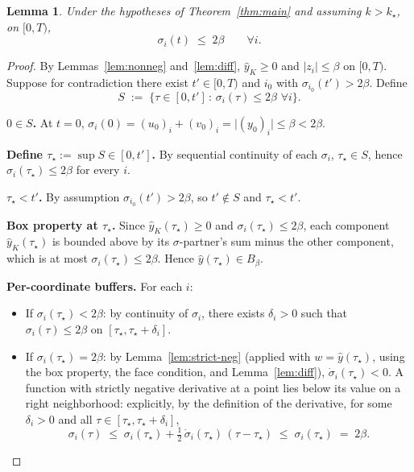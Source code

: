 \documentclass[11pt]{article}
\newtheorem{lemma}[theorem]{Lemma}
\newcommand{\abs}[1]{\lvert #1 \rvert}
\begin{document}
\begin{lemma}\label{lem:sigma}
Under the hypotheses of Theorem~\ref{thm:main} and assuming
$k > k_\star$, on $[0, T)$,
\[
  \sigma_i(t) \;\le\; 2\beta \qquad \forall i.
\]
\end{lemma}

\begin{proof}
By Lemmas~\ref{lem:nonneg} and~\ref{lem:diff}, $\widehat y_K \ge 0$ and
$\abs{z_i} \le \beta$ on $[0, T)$.  Suppose for contradiction there
exist $t' \in [0, T)$ and $i_0$ with $\sigma_{i_0}(t') > 2\beta$.
Define
\[
  S \;:=\; \bigl\{ \tau \in [0, t']\,:\,
            \sigma_i(\tau) \le 2\beta\,\,\forall i \bigr\}.
\]

\smallskip
\noindent
\textbf{$0 \in S$.}  At $t = 0$, $\sigma_i(0) = (u_0)_i + (v_0)_i =
\abs{(y_0)_i} \le \beta < 2\beta$.

\smallskip
\noindent
\textbf{Define $\tau_\star := \sup S \in [0, t']$.}  By sequential
continuity of each $\sigma_i$, $\tau_\star \in S$, hence
$\sigma_i(\tau_\star) \le 2\beta$ for every $i$.

\smallskip
\noindent
\textbf{$\tau_\star < t'$.}  By assumption $\sigma_{i_0}(t') > 2\beta$,
so $t' \notin S$ and $\tau_\star < t'$.

\smallskip
\noindent
\textbf{Box property at $\tau_\star$.}  Since $\widehat y_K(\tau_\star)
\ge 0$ and $\sigma_i(\tau_\star) \le 2\beta$, each component
$\widehat y_K(\tau_\star)$ is bounded above by its $\sigma$-partner's
sum minus the other component, which is at most $\sigma_i(\tau_\star)
\le 2\beta$.  Hence $\widehat y(\tau_\star) \in B_\beta$.

\smallskip
\noindent
\textbf{Per-coordinate buffers.}  For each $i$:
\begin{itemize}
\item If $\sigma_i(\tau_\star) < 2\beta$: by continuity of $\sigma_i$,
there exists $\delta_i > 0$ such that
$\sigma_i(\tau) \le 2\beta$ on $[\tau_\star, \tau_\star + \delta_i]$.
\item If $\sigma_i(\tau_\star) = 2\beta$: by Lemma~\ref{lem:strict-neg}
(applied with $w = \widehat y(\tau_\star)$, using the box property,
the face condition, and Lemma~\ref{lem:diff}),
$\dot \sigma_i(\tau_\star) < 0$.  A function with strictly negative
derivative at a point lies below its value on a right neighborhood:
explicitly, by the definition of the derivative, for some
$\delta_i > 0$ and all $\tau \in [\tau_\star, \tau_\star + \delta_i]$,
\[
  \sigma_i(\tau) \;\le\; \sigma_i(\tau_\star) + \tfrac{1}{2}\,
                          \dot\sigma_i(\tau_\star)\,(\tau - \tau_\star)
                 \;\le\; \sigma_i(\tau_\star) \;=\; 2\beta.
\]
\end{itemize}


\end{proof}
\end{document}
